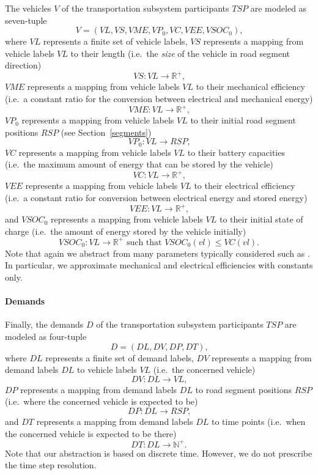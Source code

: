 The vehicles $V$ of the transportation subsystem participants $TSP$ are modeled as seven-tuple
\[
	V = (VL, VS, VME, VP_0, VC, VEE, VSOC_0) \textrm{,}
\]
where $VL$ represents a finite set of vehicle labels, $VS$ represents a mapping from vehicle labels $VL$ to their length (i.e.\ the \textit{size} of the vehicle in road segment direction)
\[
	VS : VL \rightarrow \mathbb{R}^+ \textrm{,}
\]
$VME$ represents a mapping from vehicle labels $VL$ to their mechanical efficiency (i.e.\ a constant ratio for the conversion between electrical and mechanical energy)
\[
	VME : VL \rightarrow \mathbb{R}^+ \textrm{,}
\]
$VP_0$ represents a mapping from vehicle labels $VL$ to their initial road segment positions $RSP$ (see Section~\ref{segments})
\[
	VP_0 : VL \rightarrow RSP \textrm{,}
\]
$VC$ represents a mapping from vehicle labels $VL$ to their battery capacities (i.e.\ the maximum amount of energy that can be stored by the vehicle)
\[
	VC : VL \rightarrow \mathbb{R}^+ \textrm{,}
\]
$VEE$ represents a mapping from vehicle labels $VL$ to their electrical efficiency (i.e.\ a constant ratio for conversion between electrical energy and stored energy)
\[
	VEE : VL \rightarrow \mathbb{R}^+ \textrm{,}
\]
and $VSOC_0$ represents a mapping from vehicle labels $VL$ to their initial state of charge (i.e.\ the amount of energy stored by the vehicle initially)
\[
	VSOC_0 : VL \rightarrow \mathbb{R}^+ \textrm{ such that } VSOC_0(vl) \leq VC(vl) \textrm{.}
\]
Note that again we abstract from many parameters typically considered such as . In particular, we approximate mechanical and electrical efficiencies with constants only.


\paragraph{Demands}
\label{demands}

Finally, the demands $D$ of the transportation subsystem participants $TSP$ are modeled as four-tuple
\[
	D = (DL, DV, DP, DT) \textrm{,}
\]
where $DL$ represents a finite set of demand labels, $DV$ represents a mapping from demand labels $DL$ to vehicle labels $VL$ (i.e.\ the concerned vehicle)
\[
	DV: DL \rightarrow VL \textrm{,}
\]
$DP$ represents a mapping from demand labels $DL$ to road segment positions $RSP$ (i.e.\ where the concerned vehicle is expected to be)
\[
	DP: DL \rightarrow RSP \textrm{,}
\]
and $DT$ represents a mapping from demand labels $DL$ to time points (i.e.\ when the concerned vehicle is expected to be there)
\[
	DT: DL \rightarrow \mathbb{N}^+ \textrm{.}
\]
Note that our abstraction is based on discrete time. However, we do not prescribe the time step resolution.

